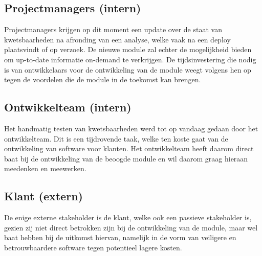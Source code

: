 \subsection{Projectmanagers (intern)}\label{subsec:projectmanagers-(intern)1}
Projectmanagers krijgen op dit moment een update over de staat van kwetsbaarheden na afronding van een analyse, welke vaak na een deploy plaatsvindt of op verzoek. De nieuwe module zal echter de mogelijkheid bieden om up-to-date informatie on-demand te verkrijgen.
De tijdsinvestering die nodig is van ontwikkelaars voor de ontwikkeling van de module weegt volgens hen op tegen de voordelen die de module in de toekomst kan brengen.

\subsection{Ontwikkelteam (intern)}\label{subsec:ontwikkelteam-(intern)1}
Het handmatig testen van kwetsbaarheden werd tot op vandaag gedaan door het ontwikkelteam. Dit is een tijdrovende taak, welke ten koste gaat van de ontwikkeling van software voor klanten. Het ontwikkelteam heeft daarom direct baat bij de ontwikkeling van de beoogde module en wil daarom graag hieraan meedenken en meewerken.

\subsection{Klant (extern)}\label{subsec:klant-(extern)1}
De enige externe stakeholder is de klant, welke ook een passieve stakeholder is, gezien zij niet direct betrokken zijn bij de ontwikkeling van de module, maar wel baat hebben bij de uitkomst hiervan, namelijk in de vorm van veiligere en betrouwbaardere software tegen potentieel lagere kosten.

